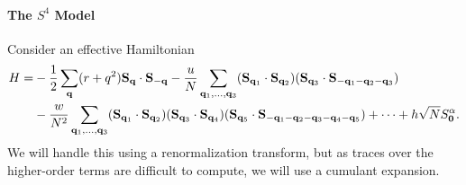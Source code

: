 \paragraph{The $S^{4}$ Model}
Consider an effective Hamiltonian
\begin{align*}
	H =& -\frac{1}{2}\sum\limits_{\vb{q}}(r + q^{2})\vb{S}_{\vb{q}}\cdot\vb{S}_{-\vb{q}} - \frac{u}{N}\sum\limits_{\vb{q}_{1}, \dots, \vb{q}_{3}}(\vb{S}_{\vb{q}_{1}}\cdot\vb{S}_{\vb{q}_{2}})(\vb{S}_{\vb{q}_{3}}\cdot\vb{S}_{-\vb{q}_{1} - \vb{q}_{2} - \vb{q}_{3}}) \\
	   &- \frac{w}{N^{2}}\sum\limits_{\vb{q}_{1}, \dots, \vb{q}_{3}}(\vb{S}_{\vb{q}_{1}}\cdot\vb{S}_{\vb{q}_{2}})(\vb{S}_{\vb{q}_{3}}\cdot\vb{S}_{\vb{q}_{4}})(\vb{S}_{\vb{q}_{5}}\cdot\vb{S}_{-\vb{q}_{1} - \vb{q}_{2} - \vb{q}_{3} - \vb{q}_{4} - \vb{q}_{5}}) + \dots + h\sqrt{N}S_{\vb{0}}^{\alpha}.
\end{align*}
We will handle this using a renormalization transform, but as traces over the higher-order terms are difficult to compute, we will use a cumulant expansion.

